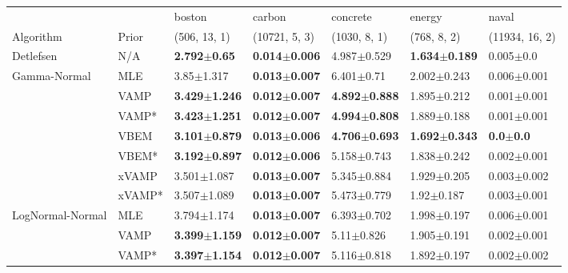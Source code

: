 \begin{tabular}{lllllll}
\toprule
                 &        &                    boston &                    carbon &                  concrete &                    energy &                 naval \\
Algorithm & Prior& (506, 13, 1)& (10721, 5, 3)& (1030, 8, 1)& (768, 8, 2)& (11934, 16, 2)\\
\midrule
Detlefsen & N/A &   \textbf{2.792$\pm$0.65} &  \textbf{0.014$\pm$0.006} &           4.987$\pm$0.529 &  \textbf{1.634$\pm$0.189} &         0.005$\pm$0.0 \\
Gamma-Normal & MLE &            3.85$\pm$1.317 &  \textbf{0.013$\pm$0.007} &            6.401$\pm$0.71 &           2.002$\pm$0.243 &       0.006$\pm$0.001 \\
                 & VAMP &  \textbf{3.429$\pm$1.246} &  \textbf{0.012$\pm$0.007} &  \textbf{4.892$\pm$0.888} &           1.895$\pm$0.212 &       0.001$\pm$0.001 \\
                 & VAMP* &  \textbf{3.423$\pm$1.251} &  \textbf{0.012$\pm$0.007} &  \textbf{4.994$\pm$0.808} &           1.889$\pm$0.188 &       0.001$\pm$0.001 \\
                 & VBEM &  \textbf{3.101$\pm$0.879} &  \textbf{0.013$\pm$0.006} &  \textbf{4.706$\pm$0.693} &  \textbf{1.692$\pm$0.343} &  \textbf{0.0$\pm$0.0} \\
                 & VBEM* &  \textbf{3.192$\pm$0.897} &  \textbf{0.012$\pm$0.006} &           5.158$\pm$0.743 &           1.838$\pm$0.242 &       0.002$\pm$0.001 \\
                 & xVAMP &           3.501$\pm$1.087 &  \textbf{0.013$\pm$0.007} &           5.345$\pm$0.884 &           1.929$\pm$0.205 &       0.003$\pm$0.002 \\
                 & xVAMP* &           3.507$\pm$1.089 &  \textbf{0.013$\pm$0.007} &           5.473$\pm$0.779 &            1.92$\pm$0.187 &       0.003$\pm$0.001 \\
LogNormal-Normal & MLE &           3.794$\pm$1.174 &  \textbf{0.013$\pm$0.007} &           6.393$\pm$0.702 &           1.998$\pm$0.197 &       0.006$\pm$0.001 \\
                 & VAMP &  \textbf{3.399$\pm$1.159} &  \textbf{0.012$\pm$0.007} &            5.11$\pm$0.826 &           1.905$\pm$0.191 &       0.002$\pm$0.001 \\
                 & VAMP* &  \textbf{3.397$\pm$1.154} &  \textbf{0.012$\pm$0.007} &           5.116$\pm$0.818 &           1.892$\pm$0.197 &       0.002$\pm$0.002 \\

\end{tabular}
